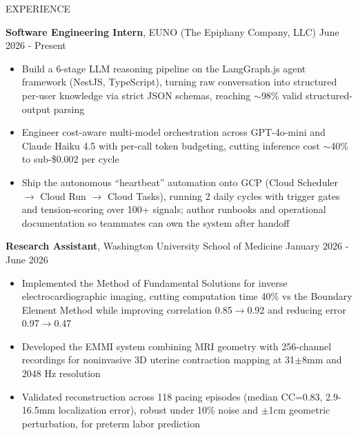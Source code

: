 \documentclass{resume}
\begin{document}
\begin{rSection}{\large EXPERIENCE}
\vspace{-0.9em}

\textbf{Software Engineering Intern}, EUNO (The Epiphany Company, LLC) \hfill June 2026 - Present
\vspace{-0.5em}
\begin{itemize}[itemsep=1.5pt, topsep=2pt]
    \item Build a 6-stage LLM reasoning pipeline on the LangGraph.js agent framework (NestJS, TypeScript), turning raw conversation into structured per-user knowledge via strict JSON schemas, reaching $\sim$98\% valid structured-output parsing
    \item Engineer cost-aware multi-model orchestration across GPT-4o-mini and Claude Haiku 4.5 with per-call token budgeting, cutting inference cost $\sim$40\% to sub-\$0.002 per cycle
    \item Ship the autonomous ``heartbeat'' automation onto GCP (Cloud Scheduler $\rightarrow$ Cloud Run $\rightarrow$ Cloud Tasks), running 2 daily cycles with trigger gates and tension-scoring over 100+ signals; author runbooks and operational documentation so teammates can own the system after handoff
\end{itemize}
\vspace{0.15em}

\textbf{Research Assistant}, Washington University School of Medicine \hfill January 2026 - June 2026
\vspace{-0.5em}
\begin{itemize}[itemsep=1.5pt, topsep=2pt]
    \item Implemented the Method of Fundamental Solutions for inverse electrocardiographic imaging, cutting computation time 40\% vs the Boundary Element Method while improving correlation 0.85$\rightarrow$0.92 and reducing error 0.97$\rightarrow$0.47
    \item Developed the EMMI system combining MRI geometry with 256-channel recordings for noninvasive 3D uterine contraction mapping at 31$\pm$8mm and 2048 Hz resolution
    \item Validated reconstruction across 118 pacing episodes (median CC=0.83, 2.9-16.5mm localization error), robust under 10\% noise and $\pm$1cm geometric perturbation, for preterm labor prediction
\end{itemize}
\vspace{0.15em}


\end{rSection}
\end{document}
